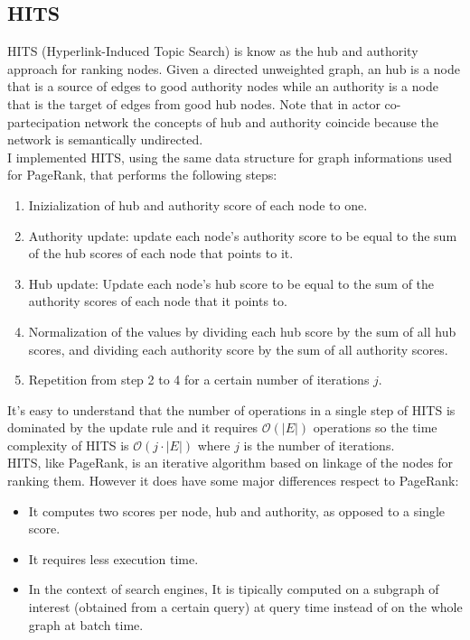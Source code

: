\documentclass{article}
\begin{document}
\subsection{HITS}
\label{hits}
HITS (Hyperlink-Induced Topic Search) is know as the hub and authority approach for ranking nodes. Given a directed unweighted graph, an hub is a node that is a source of edges to good authority nodes while an authority is a node that is the target of edges from good hub nodes. Note that in actor co-partecipation network the concepts of hub and authority coincide because the network is semantically undirected.\\
I implemented HITS, using the same data structure for graph informations used for PageRank, that performs the following steps:
\begin{enumerate}
    \item Inizialization of hub and authority score of each node to one.
    \item Authority update: update each node's authority score to be equal to the sum of the hub scores of each node that points to it.
    \item Hub update: Update each node's hub score to be equal to the sum of the authority scores of each node that it points to.
    \item Normalization of the values by dividing each hub score by the sum of all hub scores, and dividing each authority score by the sum of all authority scores.
    \item Repetition from step 2 to 4 for a certain number of iterations $j$.
\end{enumerate}
It's easy to understand that the number of operations in a single step of HITS is dominated by the update rule and it requires $\mathcal{O}(|E|)$ operations so the time complexity of HITS is $\mathcal{O}(j\cdot |E|)$ where $j$ is the number of iterations.\\
HITS, like PageRank, is an iterative algorithm based on linkage of the nodes for ranking them. However it does have some major differences respect to PageRank:
\begin{itemize}
    \item It computes two scores per node, hub and authority, as opposed to a single score.
    \item It requires less execution time.
    \item In the context of search engines, It is tipically computed on a subgraph of interest (obtained from a certain query) at query time instead of on the whole graph at batch time.
\end{itemize}
\end{document}
